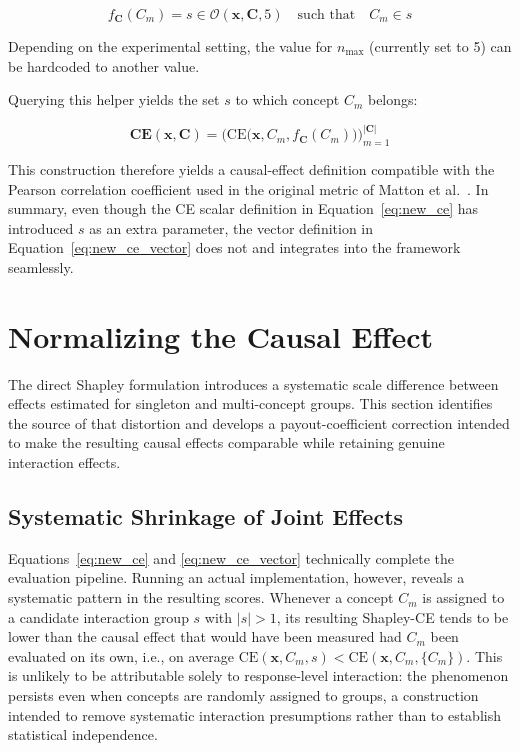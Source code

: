 \begin{equation}
	\label{eq:new_ce_vector}
	f_{\mathbf{C}}(C_m) = s \in \mathcal{O}(\mathbf{x}, \mathbf{C}, 5) \quad \text{such that} \quad C_m \in s
\end{equation}

Depending on the experimental setting, the value for $n_{\max}$ (currently set to 5) can be hardcoded to another value.

Querying this helper yields the set $s$ to which concept $C_m$ belongs:

\begin{equation}
	\mathbf{CE}(\mathbf{x}, \mathbf{C}) = \Big( \mathrm{CE}\big(\mathbf{x}, C_m, f_{\mathbf{C}}(C_m)\big) \Big)_{m=1}^{|\mathbf{C}|}
\end{equation}

This construction therefore yields a causal-effect definition compatible with the Pearson correlation coefficient used in the original metric of Matton et al.~\cite{mattonWalkTalkMeasuring2024}. In summary, even though the CE scalar definition in Equation~\ref{eq:new_ce} has introduced $s$ as an extra parameter, the vector definition in Equation~\ref{eq:new_ce_vector} does not and integrates into the framework seamlessly.

\section{Normalizing the Causal Effect}
\label{sec:shapley_correction}
The direct Shapley formulation introduces a systematic scale difference between effects estimated for singleton and multi-concept groups. This section identifies the source of that distortion and develops a payout-coefficient correction intended to make the resulting causal effects comparable while retaining genuine interaction effects.

\subsection{Systematic Shrinkage of Joint Effects}
\label{sec:kl_ceiling}

Equations~\ref{eq:new_ce} and \ref{eq:new_ce_vector} technically complete the evaluation pipeline. Running an actual implementation, however, reveals a systematic pattern in the resulting scores. Whenever a concept $C_m$ is assigned to a candidate interaction group $s$ with $|s|>1$, its resulting Shapley-CE tends to be lower than the causal effect that would have been measured had $C_m$ been evaluated on its own, i.e., on average $\mathrm{CE}(\mathbf{x},C_m,s) < \mathrm{CE}(\mathbf{x},C_m,\{C_m\})$. This is unlikely to be attributable solely to response-level interaction: the phenomenon persists even when concepts are randomly assigned to groups, a construction intended to remove systematic interaction presumptions rather than to establish statistical independence.

